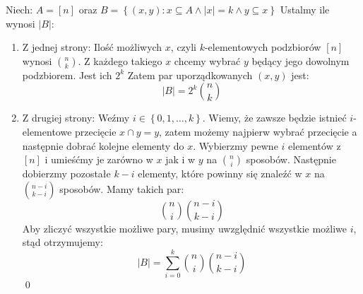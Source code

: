 \documentclass{mwart}
\begin{document}
\begin{mdframed}
    Niech: \(A = \left[n\right]\) oraz \(B = \left\{(x,y) : x\subseteq A \land |x| = k \land y\subseteq x  \right\} \) 
    \bigskip Ustalmy ile wynosi \(|B|\):
    \begin{enumerate}
        \item Z jednej strony:
        Ilość możliwych \(x\), czyli \(k\)-elementowych podzbiorów \(\left[n\right]\) wynosi \(\binom{n}{k}\).
        Z każdego takiego \(x\) chcemy wybrać \(y\) będący jego dowolnym podzbiorem. Jest ich \(2^k\)
        Zatem par uporządkowanych \((x,y)\) jest:
        \[|B| = 2^k \binom{n}{k}\]
        \item Z drugiej strony: 
        Weźmy \(i \in \left\{0,1,\dots,k \right\} \). Wiemy, że zawsze będzie istnieć \(i\)-elementowe przecięcie \(x \cap y = y\), zatem możemy najpierw wybrać przecięcie a następnie dobrać kolejne elementy do \(x\).
        Wybierzmy pewne \(i\) elementów z \(\left[n\right]\) i umieśćmy je zarówno w \(x\) jak i w \(y\) na \(\binom{n}{i}\) sposobów. Następnie dobierzmy pozostałe \(k-i\) elementy, które powinny się znaleźć w \(x\)
        na \(\binom{n-i}{k-i}\) sposobów. Mamy takich par:
        \[\binom{n}{i} \binom{n-i}{k-i}\]
        Aby zliczyć wszystkie możliwe pary, musimy uwzględnić wszystkie możliwe \(i\), stąd otrzymujemy:
        \[|B| = \sum_{i=0}^{k} \binom{n}{i} \binom{n-i}{k-i}\]
        \qed
    \end{enumerate}
\end{mdframed}
\end{document}
